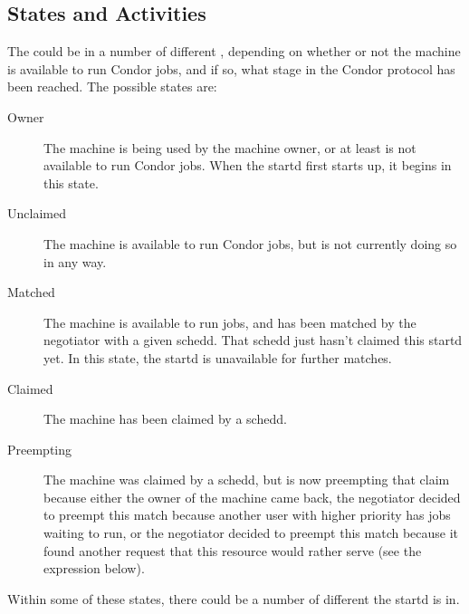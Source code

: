 \subsection{ States and Activities}
\label{sec:States-and-Activites}

The  could be in a number of different ,
depending on whether or not the machine is available to run Condor
jobs, and if so, what stage in the Condor protocol has been reached.
The possible states are:

\begin{description}
  
\item[Owner] The machine is being used by the machine owner, or at
  least is not available to run Condor jobs.  When the startd first
  starts up, it begins in this state.
  
\item[Unclaimed] The machine is available to run Condor jobs, but is
  not currently doing so in any way.
  
\item[Matched] The machine is available to run jobs, and has been
  matched by the negotiator with a given schedd.  That schedd just
  hasn't claimed this startd yet.  In this state, the startd is
  unavailable for further matches.

\item[Claimed] The machine has been claimed by a schedd. 
  
\item[Preempting] The machine was claimed by a schedd, but is now
  preempting that claim because either the owner of the machine came
  back, the negotiator decided to preempt this match because another
  user with higher priority has jobs waiting to run, or the negotiator
  decided to preempt this match because it found another request that
  this resource would rather serve (see the  expression
  below).

\end{description}

Within some of these states, there could be a number of different
 the startd is in.

